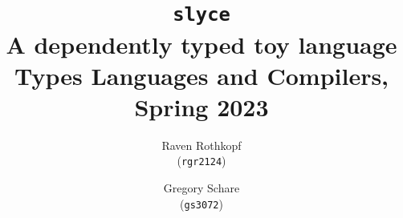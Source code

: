 \documentclass[11pt]{article}
\begin{document}
\title{\texttt{slyce}\\
    \normalsize A dependently typed toy language \\
    Types Languages and Compilers, Spring 2023}

\author{Raven Rothkopf\\ \small (\texttt{rgr2124})
    \and 
    Gregory Schare\\ \small (\texttt{gs3072})}

\maketitle
\tableofcontents\newpage




\end{document}
